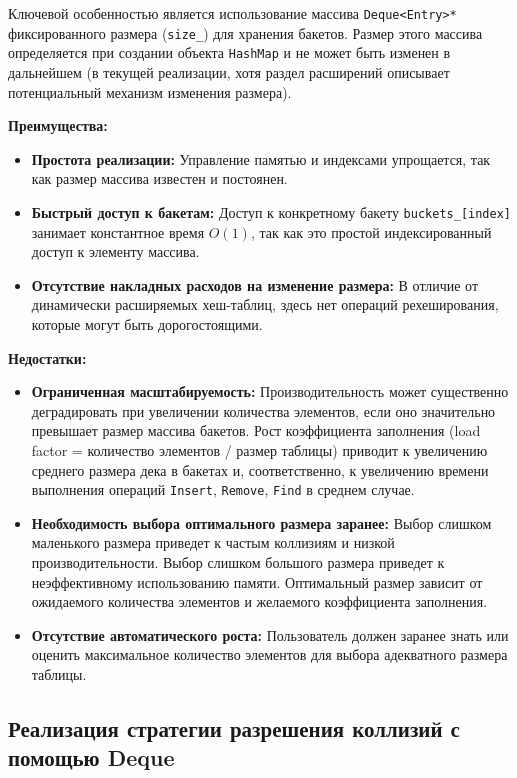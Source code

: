 \documentclass[a4paper,12pt]{article}
\begin{document}
Ключевой особенностью является использование массива \texttt{Deque<Entry>*} фиксированного размера (\texttt{size\_}) для хранения бакетов. Размер этого массива определяется при создании объекта \texttt{HashMap} и не может быть изменен в дальнейшем (в текущей реализации, хотя раздел расширений описывает потенциальный механизм изменения размера).

\textbf{Преимущества:}
\begin{itemize}
    \item \textbf{Простота реализации:} Управление памятью и индексами упрощается, так как размер массива известен и постоянен.
    \item \textbf{Быстрый доступ к бакетам:} Доступ к конкретному бакету \texttt{buckets\_[index]} занимает константное время \(O(1)\), так как это простой индексированный доступ к элементу массива.
    \item \textbf{Отсутствие накладных расходов на изменение размера:} В отличие от динамически расширяемых хеш-таблиц, здесь нет операций рехеширования, которые могут быть дорогостоящими.
\end{itemize}

\textbf{Недостатки:}
\begin{itemize}
    \item \textbf{Ограниченная масштабируемость:} Производительность может существенно деградировать при увеличении количества элементов, если оно значительно превышает размер массива бакетов. Рост коэффициента заполнения (load factor = количество элементов / размер таблицы) приводит к увеличению среднего размера дека в бакетах и, соответственно, к увеличению времени выполнения операций \texttt{Insert}, \texttt{Remove}, \texttt{Find} в среднем случае.
    \item \textbf{Необходимость выбора оптимального размера заранее:} Выбор слишком маленького размера приведет к частым коллизиям и низкой производительности. Выбор слишком большого размера приведет к неэффективному использованию памяти. Оптимальный размер зависит от ожидаемого количества элементов и желаемого коэффициента заполнения.
    \item \textbf{Отсутствие автоматического роста:} Пользователь должен заранее знать или оценить максимальное количество элементов для выбора адекватного размера таблицы.
\end{itemize}

\subsection{Реализация стратегии разрешения коллизий с помощью Deque}
\end{document}
